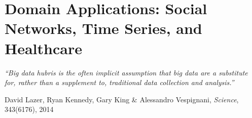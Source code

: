 
\chapter{Domain Applications: Social Networks, Time Series, and Healthcare}
\label{ch:domain-apps}

\epigraph{\textit{``Big data hubris is the often implicit assumption that
big data are a substitute for, rather than a supplement to, traditional
data collection and analysis.''}}{David Lazer, Ryan Kennedy, Gary King
\& Alessandro Vespignani, \textit{Science}, 343(6176), 2014}

\vspace{4pt}

